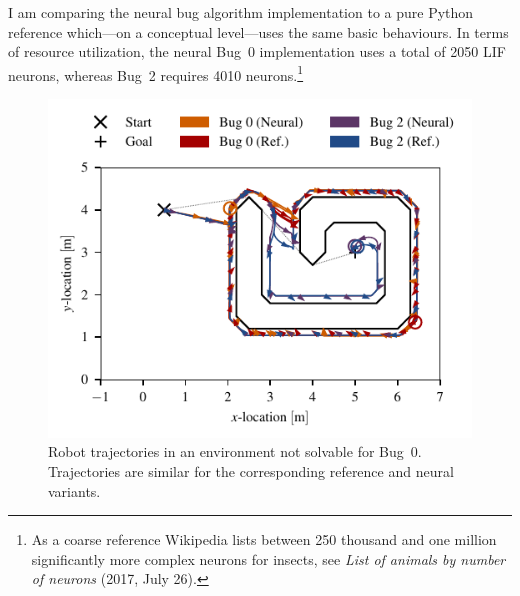 \documentclass[letterpaper,10pt,conference]{ieeeconf}
\begin{document}
I am comparing the neural bug algorithm implementation to a pure Python reference which---on a conceptual level---uses the same basic behaviours. In terms of resource utilization, the neural Bug~0 implementation uses a total of 2050 LIF neurons, whereas Bug~2 requires 4010 neurons.\footnote{As a coarse reference Wikipedia lists between 250 thousand and one million significantly more complex neurons for insects, see \emph{List of animals by number of neurons} (2017, July 26).}

\begin{figure}
	\centering
	\includegraphics{media/vis_traj_map_demo_03_bug_0_neural_bug_0_ref_bug_2_neural_bug_2_ref.pdf}
	\caption{Robot trajectories in an environment not solvable for Bug~0. Trajectories are similar for the corresponding reference and neural variants.}
	\label{fig:experiment_1_trajectory}
\end{figure}
\end{document}
